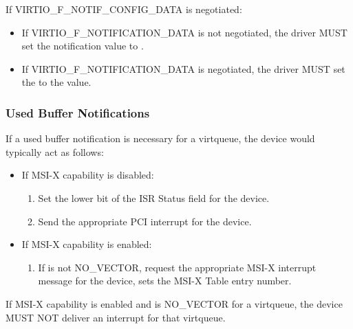 If VIRTIO_F_NOTIF_CONFIG_DATA is negotiated:
\begin{itemize}
\item If VIRTIO_F_NOTIFICATION_DATA is not negotiated, the driver MUST set
the notification value to .

\item If VIRTIO_F_NOTIFICATION_DATA is negotiated, the driver MUST set the
 to the  value.
\end{itemize}

\subsubsection{Used Buffer Notifications}\label{sec:Virtio Transport Options / Virtio Over PCI Bus / PCI-specific Initialization And Device Operation / Used Buffer Notifications}

If a used buffer notification is necessary for a virtqueue, the device would typically act as follows:

\begin{itemize}
  \item If MSI-X capability is disabled:
    \begin{enumerate}
    \item Set the lower bit of the ISR Status field for the device.

    \item Send the appropriate PCI interrupt for the device.
    \end{enumerate}

  \item If MSI-X capability is enabled:
    \begin{enumerate}
    \item If  is not NO_VECTOR,
      request the appropriate MSI-X interrupt message for the
      device,  sets the MSI-X Table entry
      number.
    \end{enumerate}
\end{itemize}


If MSI-X capability is enabled and  is
NO_VECTOR for a virtqueue, the device MUST NOT deliver an interrupt
for that virtqueue.

